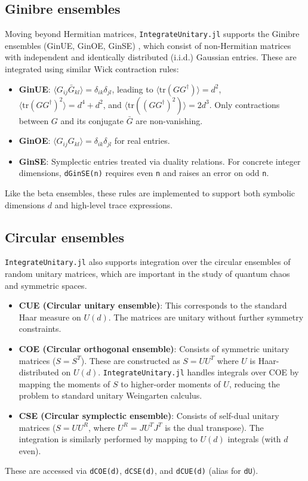 \documentclass[manuscript,screen]{acmart}
\begin{document}
\subsection{Ginibre ensembles}
Moving beyond Hermitian matrices, \texttt{IntegrateUnitary.jl} supports the Ginibre
ensembles (GinUE, GinOE, GinSE) \cite{ginibre1965statistical}, which consist of
non-Hermitian matrices with independent and identically distributed (i.i.d.)
Gaussian entries. These are integrated using similar Wick contraction rules:
\begin{itemize}
    \item \textbf{GinUE}: $\langle G_{ij} \bar{G}_{kl} \rangle = \delta_{ik} \delta_{jl}$, leading to $\langle \mathrm{tr}(G G^\dagger) \rangle = d^2$, $\langle \mathrm{tr}(G G^\dagger)^2 \rangle = d^4 + d^2$, and $\langle \mathrm{tr}((G G^\dagger)^2) \rangle = 2d^3$. Only contractions between $G$ and its conjugate $\bar{G}$ are non-vanishing.
    \item \textbf{GinOE}: $\langle G_{ij} G_{kl} \rangle = \delta_{ik}
    \delta_{jl}$ for real entries.
    \item \textbf{GinSE}: Symplectic entries treated via duality relations. For
    concrete integer dimensions, \texttt{dGinSE(n)} requires even \texttt{n} and
    raises an error on odd \texttt{n}.
\end{itemize}
Like the beta ensembles, these rules are implemented to support both symbolic 
dimensions $d$ and high-level trace expressions.

\subsection{Circular ensembles}
\texttt{IntegrateUnitary.jl} also supports integration over the circular ensembles of random
unitary matrices, which are important in the study of quantum chaos and
symmetric spaces.
\begin{itemize}
    \item \textbf{CUE (Circular unitary ensemble)}: This corresponds to the
    standard Haar measure on $U(d)$. The matrices are unitary without further
    symmetry constraints.
    \item \textbf{COE (Circular orthogonal ensemble)}: Consists of symmetric
    unitary matrices ($S = S^T$). These are constructed as $S = U U^T$ where $U$
    is Haar-distributed on $U(d)$. \texttt{IntegrateUnitary.jl} handles integrals over COE
    by mapping the moments of $S$ to higher-order moments of $U$, reducing the
    problem to standard unitary Weingarten calculus.
    \item \textbf{CSE (Circular symplectic ensemble)}: Consists of self-dual
    unitary matrices ($S = U U^R$, where $U^R = J U^T J^T$ is the dual
    transpose). The integration is similarly performed by mapping to $U(d)$
    integrals (with $d$ even).
\end{itemize}
These are accessed via \texttt{dCOE(d)}, \texttt{dCSE(d)}, and
\texttt{dCUE(d)} (alias for \texttt{dU}).
\end{document}
